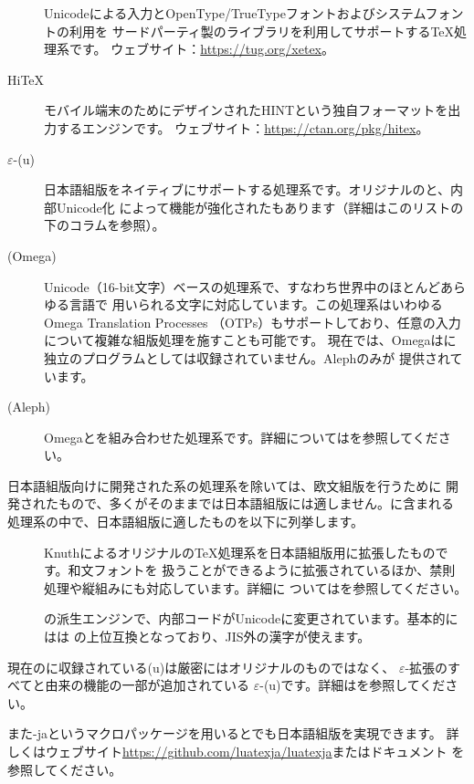 \documentclass[uplatex,dvipdfmx,12pt,tombow]{jsarticle}
\begin{document}
\begin{description}
\item[\XeTeX]
Unicodeによる入力とOpenType\slash TrueTypeフォントおよびシステムフォントの利用を
サードパーティ製のライブラリを利用してサポートする\TeX 処理系です。
ウェブサイト：\url{https://tug.org/xetex}。

\item[Hi\TeX]
モバイル端末のためにデザインされたHINTという独自フォーマットを出力するエンジンです。
ウェブサイト：\url{https://ctan.org/pkg/hitex}。

\item[$\varepsilon$-(u)\pTeX]
日本語組版をネイティブにサポートする処理系です。オリジナルの\pTeX と、内部Unicode化
によって機能が強化された\upTeX もあります（詳細はこのリストの下のコラムを参照）。

\item[{\OMEGA} (Omega)]
Unicode（16-bit文字）ベースの処理系で、すなわち世界中のほとんどあらゆる言語で
用いられる文字に対応しています。この処理系はいわゆるOmega Translation Processes
（OTPs）もサポートしており、任意の入力について複雑な組版処理を施すことも可能です。
現在では、Omegaは\TL に独立のプログラムとしては収録されていません。Alephのみが
提供されています。

\item[{\ALEPH} (Aleph)]
Omegaと\eTeX を組み合わせた処理系です。詳細についてはを参照してください。
\end{description}
%
\begin{janote}
日本語組版向けに開発された\pTeX 系の処理系を除いては、欧文組版を行うために
開発されたもので、多くがそのままでは日本語組版には適しません。\TL に含まれる
処理系の中で、日本語組版に適したものを以下に列挙します。
%
\begin{description}
\item[\pTeX]
Knuthによるオリジナルの\TeX 処理系を日本語組版用に拡張したものです。和文フォントを
扱うことができるように拡張されているほか、禁則処理や縦組みにも対応しています。詳細に
ついてはを参照してください。

\item[\upTeX]
\pTeX の派生エンジンで、内部コードがUnicodeに変更されています。基本的には\upTeX は
\pTeX の上位互換となっており、JIS外の漢字が使えます。
\end{description}
%
現在の\TL に収録されている(u)\pTeX は厳密にはオリジナルのものではなく、
$\varepsilon$-拡張のすべてと\pdfTeX 由来の機能の一部が追加されている
$\varepsilon$-(u)\pTeX です。詳細はを参照してください。

また\LuaTeX-jaというマクロパッケージを用いると\LuaTeX でも日本語組版を実現できます。
詳しくはウェブサイト\url{https://github.com/luatexja/luatexja}またはドキュメント
を参照してください。
\end{janote}
\end{document}
